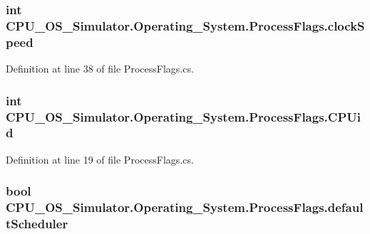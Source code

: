 \subsubsection[{clock\+Speed}]{\setlength{\rightskip}{0pt plus 5cm}int C\+P\+U\+\_\+\+O\+S\+\_\+\+Simulator.\+Operating\+\_\+\+System.\+Process\+Flags.\+clock\+Speed}\label{struct_c_p_u___o_s___simulator_1_1_operating___system_1_1_process_flags_a28dbea54b61ff7f12d5dc8c3c40f632d}


Definition at line 38 of file Process\+Flags.\+cs.

\hypertarget{struct_c_p_u___o_s___simulator_1_1_operating___system_1_1_process_flags_a204157ba5a9571934344bef2378f88bf}{}
\subsubsection[{C\+P\+Uid}]{\setlength{\rightskip}{0pt plus 5cm}int C\+P\+U\+\_\+\+O\+S\+\_\+\+Simulator.\+Operating\+\_\+\+System.\+Process\+Flags.\+C\+P\+Uid}\label{struct_c_p_u___o_s___simulator_1_1_operating___system_1_1_process_flags_a204157ba5a9571934344bef2378f88bf}


Definition at line 19 of file Process\+Flags.\+cs.

\hypertarget{struct_c_p_u___o_s___simulator_1_1_operating___system_1_1_process_flags_a927e8e998250ab57385146cf8dd487b8}{}
\subsubsection[{default\+Scheduler}]{\setlength{\rightskip}{0pt plus 5cm}bool C\+P\+U\+\_\+\+O\+S\+\_\+\+Simulator.\+Operating\+\_\+\+System.\+Process\+Flags.\+default\+Scheduler}\label{struct_c_p_u___o_s___simulator_1_1_operating___system_1_1_process_flags_a927e8e998250ab57385146cf8dd487b8}


